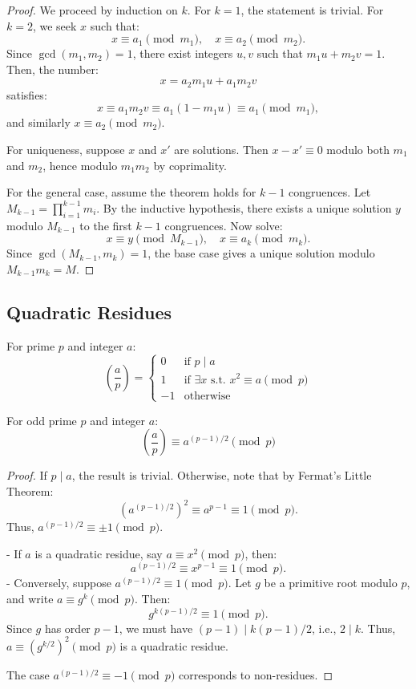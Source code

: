 \documentclass{scrartcl} %
\begin{document}
\begin{proof}
We proceed by induction on $k$. For $k = 1$, the statement is trivial. For $k = 2$, we seek $x$ such that:
\[
x \equiv a_1 \pmod{m_1}, \quad x \equiv a_2 \pmod{m_2}.
\]
Since $\gcd(m_1, m_2) = 1$, there exist integers $u, v$ such that $m_1 u + m_2 v = 1$. Then, the number:
\[
x = a_2 m_1 u + a_1 m_2 v
\]
satisfies:
\[
x \equiv a_1 m_2 v \equiv a_1 (1 - m_1 u) \equiv a_1 \pmod{m_1},
\]
and similarly $x \equiv a_2 \pmod{m_2}$. 

For uniqueness, suppose $x$ and $x'$ are solutions. Then $x - x' \equiv 0$ modulo both $m_1$ and $m_2$, hence modulo $m_1 m_2$ by coprimality.

For the general case, assume the theorem holds for $k-1$ congruences. Let $M_{k-1} = \prod_{i=1}^{k-1} m_i$. By the inductive hypothesis, there exists a unique solution $y$ modulo $M_{k-1}$ to the first $k-1$ congruences. Now solve:
\[
x \equiv y \pmod{M_{k-1}}, \quad x \equiv a_k \pmod{m_k}.
\]
Since $\gcd(M_{k-1}, m_k) = 1$, the base case gives a unique solution modulo $M_{k-1} m_k = M$.
\end{proof}

\subsection{Quadratic Residues}

\begin{definition}\label{def:legendresymbol}
For prime $p$ and integer $a$:
\[ \left(\frac{a}{p}\right) = \begin{cases}
0 & \text{if } p \mid a \\
1 & \text{if } \exists x \text{ s.t. } x^2 \equiv a \pmod{p} \\
-1 & \text{otherwise}
\end{cases}\]
\end{definition}

\begin{theorem}\label{thm:eulerscriterion}
For odd prime $p$ and integer $a$:
\[ \left(\frac{a}{p}\right) \equiv a^{(p-1)/2} \pmod{p} \]
\end{theorem}

\begin{proof}
If $p \mid a$, the result is trivial. Otherwise, note that by Fermat's Little Theorem:
\[
(a^{(p-1)/2})^2 \equiv a^{p-1} \equiv 1 \pmod{p}.
\]
Thus, $a^{(p-1)/2} \equiv \pm 1 \pmod{p}$.

- If $a$ is a quadratic residue, say $a \equiv x^2 \pmod{p}$, then:
\[
a^{(p-1)/2} \equiv x^{p-1} \equiv 1 \pmod{p}.
\]
- Conversely, suppose $a^{(p-1)/2} \equiv 1 \pmod{p}$. Let $g$ be a primitive root modulo $p$, and write $a \equiv g^k \pmod{p}$. Then:
\[
g^{k(p-1)/2} \equiv 1 \pmod{p}.
\]
Since $g$ has order $p-1$, we must have $(p-1) \mid k(p-1)/2$, i.e., $2 \mid k$. Thus, $a \equiv (g^{k/2})^2 \pmod{p}$ is a quadratic residue.

The case $a^{(p-1)/2} \equiv -1 \pmod{p}$ corresponds to non-residues.
\end{proof}
\end{document}

